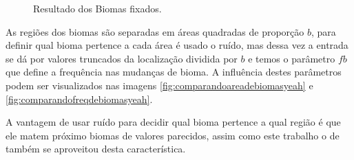 \begin{figure}[H]
     \caption{Resultado dos Biomas fixados.}
     
     \label{fig:bssComBiomasFixados}
\end{figure}

As regiões dos biomas são separadas em áreas quadradas de proporção $b$, para definir
qual bioma pertence a cada área é usado o ruído, mas dessa vez a entrada se dá por valores
truncados da localização dividida por $b$ e temos o parâmetro $fb$ que define a frequência nas
mudanças de bioma. A influência destes parâmetros podem ser visualizados nas imagens \ref{fig:comparandoareadebiomasyeah} e \ref{fig:comparandofreqdebiomasyeah}.

A vantagem de usar ruído para decidir qual bioma pertence a qual 
região é que ele matem próximo biomas de valores parecidos, assim como este trabalho o de
\cite{patel2010polygonal} também se aproveitou desta característica.

